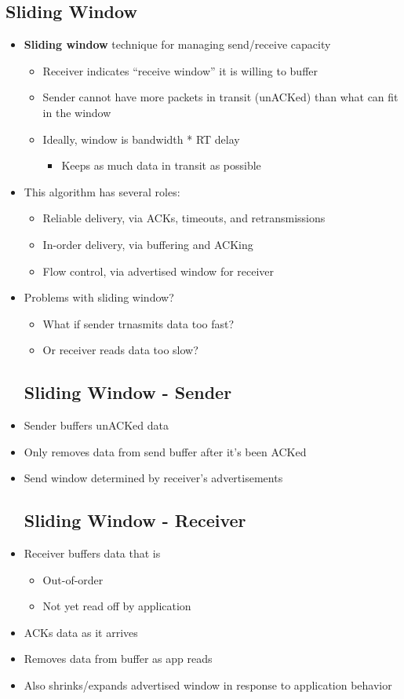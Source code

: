 \subsection{Sliding Window}
\begin{itemize}
	\item \textbf{Sliding window} technique for managing send/receive capacity
	\begin{itemize}
		\item Receiver indicates ``receive window'' it is willing to buffer
		\item Sender cannot have more packets in transit (unACKed) than what can fit in the window
		\item Ideally, window is bandwidth * RT delay
		\begin{itemize}
			\item Keeps as much data in transit as possible
		\end{itemize}
	\end{itemize}
	\item This algorithm has several roles:
	\begin{itemize}
		\item Reliable delivery, via ACKs, timeouts, and retransmissions
		\item In-order delivery, via buffering and ACKing
		\item Flow control, via advertised window for receiver
	\end{itemize}
	\item Problems with sliding window?
	\begin{itemize}
		\item What if sender trnasmits data too fast?
		\item Or receiver reads data too slow?
	\end{itemize}
	\subsection{Sliding Window - Sender}
	\item Sender buffers unACKed data
	\item Only removes data from send buffer after it's been ACKed
	\item Send window determined by receiver's advertisements
	\subsection{Sliding Window - Receiver}
	\item Receiver buffers data that is 
	\begin{itemize}
		\item Out-of-order
		\item Not yet read off by application
	\end{itemize}
	\item ACKs data as it arrives
	\item Removes data from buffer as app reads
	\item Also shrinks/expands advertised window in response to application behavior

\end{itemize}
